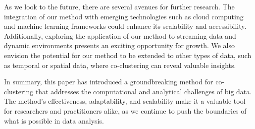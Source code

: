 As we look to the future, there are several avenues for further research. The integration of our method with emerging technologies such as cloud computing and machine learning frameworks could enhance its scalability and accessibility. Additionally, exploring the application of our method to streaming data and dynamic environments presents an exciting opportunity for growth. We also envision the potential for our method to be extended to other types of data, such as temporal or spatial data, where co-clustering can reveal valuable insights.

In summary, this paper has introduced a groundbreaking method for co-clustering that addresses the computational and analytical challenges of big data. The method's effectiveness, adaptability, and scalability make it a valuable tool for researchers and practitioners alike, as we continue to push the boundaries of what is possible in data analysis.
